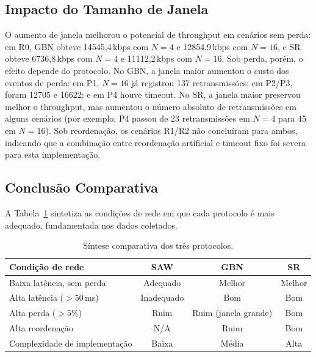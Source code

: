 \documentclass[10pt,a4paper]{article}
\begin{document}
\subsection{Impacto do Tamanho de Janela}

O aumento de janela melhorou o potencial de throughput em cenários sem perda:
em R0, GBN obteve 14545{,}4\,kbps com $N=4$ e 12854{,}9\,kbps com $N=16$, e SR
obteve 6736{,}8\,kbps com $N=4$ e 11112{,}2\,kbps com $N=16$. Sob perda, porém,
o efeito depende do protocolo. No GBN, a janela maior aumentou o custo dos
eventos de perda: em P1, $N=16$ já registrou 137 retransmissões; em P2/P3, foram
12705 e 16622; e em P4 houve timeout. No SR, a janela maior preservou melhor o
throughput, mas aumentou o número absoluto de retransmissões em alguns cenários
(por exemplo, P4 passou de 23 retransmissões em $N=4$ para 45 em $N=16$). Sob
reordenação, os cenários R1/R2 não concluíram para ambos, indicando que a
combinação entre reordenação artificial e timeout fixo foi severa para esta
implementação.

\subsection{Conclusão Comparativa}

A Tabela~\ref{tab:conclusao} sintetiza as condições de rede em que cada protocolo
é mais adequado, fundamentada nos dados coletados.

\begin{table}[H]
\centering
\caption{Síntese comparativa dos três protocolos.}
\label{tab:conclusao}
\begin{tabular}{@{}lccc@{}}
\toprule
\textbf{Condição de rede} & \textbf{SAW} & \textbf{GBN} & \textbf{SR} \\
\midrule
Baixa latência, sem perda      & Adequado & Melhor & Melhor \\
Alta latência ($> 50$\,ms)     & Inadequado & Bom & Bom \\
Alta perda ($> 5\%$)           & Ruim & Ruim (janela grande) & Bom \\
Alta reordenação               & N/A & Ruim & Bom \\
Complexidade de implementação  & Baixa & Média & Alta \\
\bottomrule
\end{tabular}
\end{table}
\end{document}
